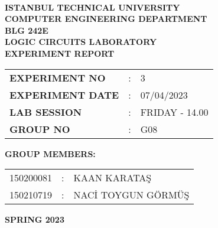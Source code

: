 \documentclass[pdftex,12pt,a4paper]{article}
\begin{document}
\begin{titlepage}
\begin{center}
\textbf{}\\
\textbf{\Large{ISTANBUL TECHNICAL UNIVERSITY}}\\
\vspace{0.5cm}
\textbf{\Large{COMPUTER ENGINEERING DEPARTMENT}}\\
\vspace{2cm}
\textbf{\Large{BLG 242E}}\\
\vspace{0.2cm}
\textbf{\Large{LOGIC CIRCUITS LABORATORY}}\\
\vspace{0.2cm}
\textbf{\Large{EXPERIMENT REPORT}}\\
\vspace{2cm}
\begin{table}[ht]
\centering
\Large{
\begin{tabular}{lcl}
\textbf{EXPERIMENT NO}  & : & 3 \\
\textbf{EXPERIMENT DATE}  & : & 07/04/2023 \\
\textbf{LAB SESSION}  & : & FRIDAY - 14.00 \\
\textbf{GROUP NO}  & : & G08 \\
\end{tabular}}\end{table}\vspace{1cm}
\textbf{\Large{GROUP MEMBERS:}}\\
\begin{table}[ht]\centering\Large{
\begin{tabular}{rcl}
150200081  & : & KAAN KARATAŞ \\
150210719  & : & NACİ TOYGUN GÖRMÜŞ \\
\end{tabular}}
\end{table}
\vspace{2.8cm}
\textbf{\Large{SPRING 2023}}
\end{center}
\end{titlepage}
\end{document}
